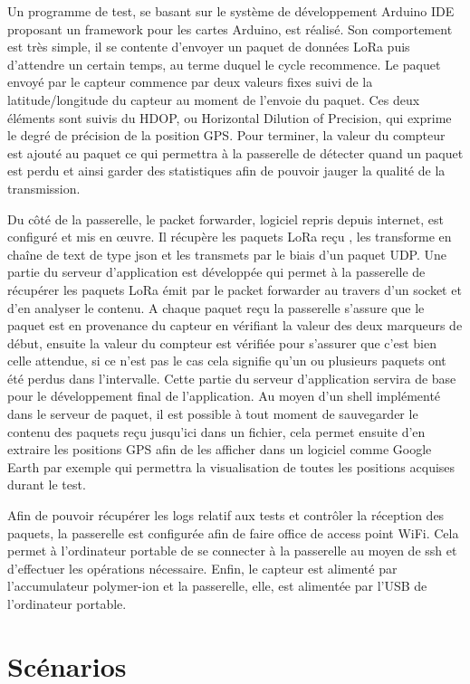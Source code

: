 Un programme de test, se basant sur le système de développement Arduino IDE proposant un framework pour les cartes Arduino, est réalisé. Son comportement est très simple, il se contente d'envoyer un paquet de données LoRa puis d'attendre un certain temps, au terme duquel le cycle recommence. Le paquet envoyé par le capteur commence par deux valeurs fixes suivi de la latitude/longitude du capteur au moment de l'envoie du paquet. Ces deux éléments sont suivis du HDOP, ou Horizontal Dilution of Precision, qui exprime le degré de précision de la position GPS. Pour terminer, la valeur du compteur est ajouté au paquet ce qui permettra à la passerelle de détecter quand un paquet est perdu et ainsi garder des statistiques afin de pouvoir jauger la qualité de la transmission.

Du côté de la passerelle, le packet forwarder, logiciel repris depuis internet, est configuré et mis en œuvre. Il récupère les paquets LoRa reçu , les transforme en chaîne de text de type json et les transmets par le biais d'un paquet UDP. Une partie du serveur d'application est développée qui permet à la passerelle de récupérer les paquets LoRa émit par le packet forwarder au travers d'un socket et d'en analyser le contenu. A chaque paquet reçu la passerelle s'assure que le paquet est en provenance du capteur en vérifiant la valeur des deux marqueurs de début, ensuite la valeur du compteur est vérifiée pour s'assurer que c'est bien celle attendue, si ce n'est pas le cas cela signifie qu'un ou plusieurs paquets ont été perdus dans l'intervalle. Cette partie du serveur d'application servira de base pour le développement final de l'application. 
Au moyen d'un shell implémenté dans le serveur de paquet, il est possible à tout moment de sauvegarder le contenu des paquets reçu jusqu'ici dans un fichier, cela permet ensuite d'en extraire les positions GPS afin de les afficher dans un logiciel comme Google Earth par exemple qui permettra la visualisation de toutes les positions acquises durant le test.

Afin de pouvoir récupérer les logs relatif aux tests et contrôler la réception des paquets, la passerelle est configurée afin de faire office de access point WiFi. Cela permet à l'ordinateur portable de se connecter à la passerelle au moyen de ssh et d'effectuer les opérations nécessaire.
Enfin, le capteur est alimenté par l'accumulateur polymer-ion et la passerelle, elle, est alimentée par l'USB de l'ordinateur portable.

\section{Scénarios}

